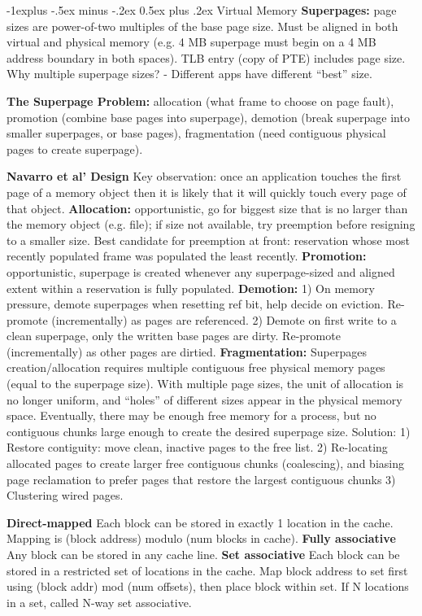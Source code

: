 \documentclass[6pt,landscape]{article}
\makeatletter
\renewcommand{\subsection}{\@startsection{subsection}{2}{0mm}%
                                {-1explus -.5ex minus -.2ex}%
                                {0.5ex plus .2ex}%
                                {\normalfont\normalsize\bfseries}}
\makeatother
\begin{document}
\begin{multicols}{3}
\subsection{Virtual Memory}
{\bf Superpages:} page sizes are power-of-two multiples of the base page size.
Must be aligned in both virtual and physical memory (e.g. 4 MB superpage must begin on a 4 MB address boundary in both spaces).
TLB entry (copy of PTE) includes page size.
Why multiple superpage sizes? - Different apps have different “best” size.

{\bf The Superpage Problem:} allocation (what frame to choose on page fault), promotion (combine base pages into superpage), demotion (break superpage into smaller superpages, or base pages), fragmentation (need contiguous physical pages to create superpage).

{\bf Navarro et al' Design}
Key observation: once an application touches the first page of a memory object then it is likely that it will quickly touch every page of that object.
{\bf Allocation:} opportunistic, go for biggest size that is no larger than the memory object (e.g. file); if size not available, try preemption before resigning to a smaller size. Best candidate for preemption at front: reservation whose most recently populated frame was populated the least recently.
{\bf Promotion:} opportunistic, superpage is created whenever any superpage-sized and aligned extent within a reservation is fully populated.
{\bf Demotion:} 1) On memory pressure, demote superpages when resetting ref bit, help decide on eviction. Re-promote (incrementally) as pages are referenced. 2) Demote on first write to a clean superpage, only the written base pages are dirty. Re-promote (incrementally) as other pages are dirtied.
{\bf Fragmentation:} Superpages creation/allocation requires multiple contiguous free physical memory pages (equal to the superpage size). With multiple page sizes, the unit of allocation is no longer uniform, and “holes” of different sizes appear in the physical memory space. Eventually, there may be enough free memory for a process, but no contiguous chunks large enough to create the desired superpage size. Solution: 1) Restore contiguity: move clean, inactive pages to the free list. 2) Re-locating allocated pages to create larger free contiguous chunks (coalescing), and biasing page reclamation to prefer pages that restore the largest contiguous chunks 3) Clustering wired pages.

{\bf Direct-mapped} Each block can be stored in exactly 1 location in the cache. Mapping is (block address) modulo (num blocks in cache).
{\bf Fully associative} Any block can be stored in any cache line.
{\bf Set associative} Each block can be stored in a restricted set of locations in the cache.
Map block address to set first using (block addr) mod (num offsets), then place block within set. If N locations in a set, called N-way set associative.


\end{multicols}
\end{document}
